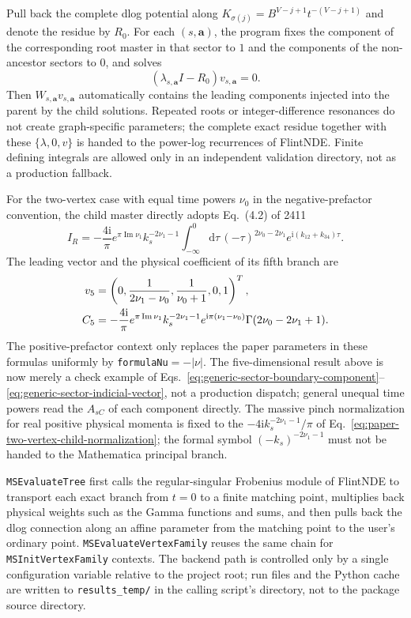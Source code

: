 \documentclass[11pt,a4paper]{article}
\newcommand{\dd}{\mathrm d}
\newcommand{\ii}{\mathrm i}
\begin{document}
Pull back the complete dlog potential along $K_{\sigma(j)}=B^{V-j+1}t^{-(V-j+1)}$ and denote the residue by $R_0$. For each $(s,\bm a)$, the program fixes the component of the corresponding root master in that sector to $1$ and the components of the non-ancestor sectors to $0$, and solves
\begin{equation}
 (\lambda_{s,\bm a}I-R_0)v_{s,\bm a}=0.
 \label{eq:generic-sector-indicial-vector}
\end{equation}
Then $W_{s,\bm a}v_{s,\bm a}$ automatically contains the leading components injected into the parent by the child solutions. Repeated roots or integer-difference resonances do not create graph-specific parameters; the complete exact residue together with these $\{\lambda,0,v\}$ is handed to the power-log recurrences of FlintNDE. Finite defining integrals are allowed only in an independent validation directory, not as a production fallback.

For the two-vertex case with equal time powers $\nu_0$ in the negative-prefactor convention, the child master directly adopts Eq.~(4.2) of 2411
\begin{equation}
 I_R=-\frac{4\ii}{\pi}e^{\pi\operatorname{Im}\nu_1}k_s^{-2\nu_1-1}
 \int_{-\infty}^{0}\dd\tau\,(-\tau)^{2\nu_0-2\nu_1}
 e^{\ii(k_{12}+k_{34})\tau}.
 \label{eq:paper-two-vertex-child-normalization}
\end{equation}
The leading vector and the physical coefficient of its fifth branch are
\begin{align}
 v_5&=\left(0,\frac{1}{2\nu_1-\nu_0},\frac{1}{\nu_0+1},0,1\right)^T,
 \notag\\
 C_5&=-\frac{4\ii}{\pi}e^{\pi\operatorname{Im}\nu_1}
 k_s^{-2\nu_1-1}e^{\ii\pi(\nu_1-\nu_0)}
 \Gamma(2\nu_0-2\nu_1+1).
 \label{eq:paper-two-vertex-contact-boundary}
\end{align}
The positive-prefactor context only replaces the paper parameters in these formulas uniformly by \texttt{formulaNu}$=-|\nu|$. The five-dimensional result above is now merely a check example of Eqs.~\eqref{eq:generic-sector-boundary-component}--\eqref{eq:generic-sector-indicial-vector}, not a production dispatch; general unequal time powers read the $A_{sC}$ of each component directly. The massive pinch normalization for real positive physical momenta is fixed to the $-4\ii k_s^{-2\nu_1-1}/\pi$ of Eq.~\eqref{eq:paper-two-vertex-child-normalization}; the formal symbol $(-k_s)^{-2\nu_1-1}$ must not be handed to the Mathematica principal branch.

\texttt{MSEvaluateTree} first calls the regular-singular Frobenius module of FlintNDE to transport each exact branch from $t=0$ to a finite matching point, multiplies back physical weights such as the Gamma functions and sums, and then pulls back the dlog connection along an affine parameter from the matching point to the user's ordinary point. \texttt{MSEvaluateVertexFamily} reuses the same chain for \texttt{MSInitVertexFamily} contexts. The backend path is controlled only by a single configuration variable relative to the project root; run files and the Python cache are written to \texttt{results\_temp/} in the calling script's directory, not to the package source directory.
\end{document}
